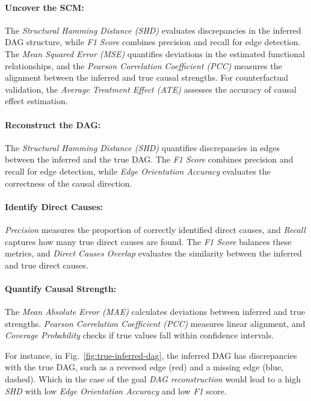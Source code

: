 \documentclass{article}
\begin{document}
            \paragraph{Uncover the SCM:}
                The \emph{Structural Hamming Distance (SHD)} evaluates discrepancies in the inferred DAG structure, while \emph{F1 Score} combines precision and recall for edge detection. 
                The \emph{Mean Squared Error (MSE)} quantifies deviations in the estimated functional relationships, and the \emph{Pearson Correlation Coefficient (PCC)} measures the alignment between the inferred and true causal strengths. 
                For counterfactual validation, the \emph{Average Treatment Effect (ATE)} assesses the accuracy of causal effect estimation.

            \paragraph{Reconstruct the DAG:}
                The \emph{Structural Hamming Distance (SHD)} quantifies discrepancies in edges between the inferred and the true DAG.
                The \emph{F1 Score} combines precision and recall for edge detection, while \emph{Edge Orientation Accuracy} evaluates the correctness of the causal direction.
            
            \paragraph{Identify Direct Causes:}
                \emph{Precision} measures the proportion of correctly identified direct causes, and \emph{Recall} captures how many true direct causes are found. 
                The \emph{F1 Score} balances these metrics, and \emph{Direct Causes Overlap} evaluates the similarity between the inferred and true direct causes.
            
            \paragraph{Quantify Causal Strength:}
                The \emph{Mean Absolute Error (MAE)} calculates deviations between inferred and true strengths. 
                \emph{Pearson Correlation Coefficient (PCC)} measures linear alignment, and \emph{Coverage Probability} checks if true values fall within confidence intervals.

            For instance, in Fig.~\ref{fig:true-inferred-dag}, the inferred DAG has discrepancies with the true DAG, such as a reversed edge (red) and a missing edge (blue, dashed).
            Which in the case of the goal \emph{DAG reconstruction} would lead to a high \emph{SHD} with low \emph{Edge Orientation Accuracy} and low \emph{F1} score.
\end{document}
